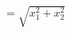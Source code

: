 \documentclass[preview]{standalone}
\begin{document}
\begin{align*}
= \sqrt{ x_{1}^{2}+x_{2}^{2} }
\end{align*}
\end{document}
